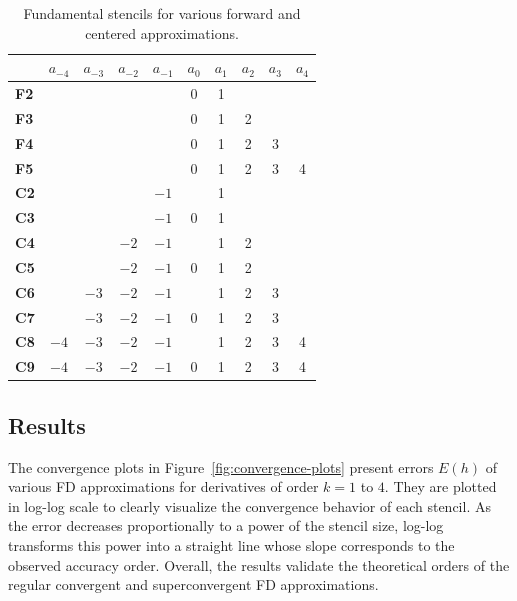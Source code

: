 \documentclass[12pt]{article}
\begin{document}
\begin{table}[h!]
\centering
\begin{tabular}{ l@{\hskip 2pt} ||c@{\hskip 2pt}| c@{\hskip 2pt} | c@{\hskip 2pt} | c@{\hskip 2pt} | c@{\hskip 2pt} | c@{\hskip 2pt} | c@{\hskip 2pt} | c@{\hskip 2pt} | c@{\hskip 2pt} }
& $a_{-4}$ & $a_{-3}$ & $a_{-2}$ &$a_{-1}$ & $a_0$& $a_1$ & $a_2$ & $a_3$ & $a_4$ 
\\ \hline \hline
\textbf{F2}&& & & & 0 & 1 &  &  & \\ \hline
\textbf{F3}&& & & & 0 & 1 & 2 &  & \\ \hline
\textbf{F4}&& & & & 0 & 1 & 2 &  3 & \\ \hline
\textbf{F5}&& & & & 0 & 1 & 2 & 3 & 4\\ \hline
\textbf{C2}&& & & $-1$ &  & 1 &  & & \\ \hline
\textbf{C3}&& & & $-1$ & 0 & 1 &  & & \\ \hline
\textbf{C4}&& & $-2$ & $-1$ &  & 1 & 2 & & \\ \hline
\textbf{C5}&& & $-2$ & $-1$ & 0 & 1 & 2 & & \\ \hline
\textbf{C6}&& $-3$ & $-2$ & $-1$ & & 1 & 2 & 3 & \\ \hline
\textbf{C7}&& $-3$ & $-2$ & $-1$ & 0 & 1 & 2 & 3 & \\ \hline
\textbf{C8}& $-4$ & $-3$ & $-2$ & $-1$ &  & 1 & 2 & 3 & 4\\ \hline
\textbf{C9}& $-4$ & $-3$ & $-2$ & $-1$ & 0 & 1 & 2 & 3 & 4\\
\end{tabular}
\caption{Fundamental stencils for various forward and centered approximations.}
\label{table:stencil-sketches}
\end{table}


\subsection{Results}

The convergence plots in Figure~\ref{fig:convergence-plots} present errors $E(h)$ of various FD approximations for derivatives of order $k=1$ to $4$. 
They are plotted in log-log scale to clearly visualize the convergence behavior of each stencil. 
As the error decreases proportionally to a power of the stencil size, log-log transforms this power into a straight line whose slope corresponds to the observed accuracy order.
Overall, the results validate the theoretical orders of the regular convergent and superconvergent FD approximations. 
\end{document}
